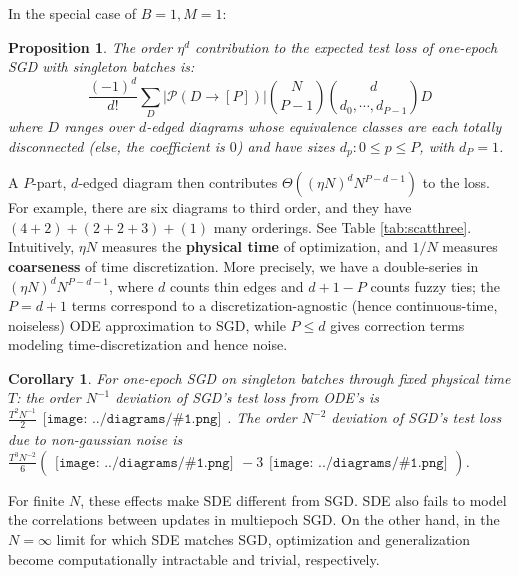 \documentclass{article}
\newtheorem{cor}{Corollary}
\newtheorem{prop}{Proposition}
\newcommand{\Pp}{\mathcal{P}}
\newcommand{\wrap}[1]{\left( #1 \right)}
\newcommand{\dia} [1]{\begin{gathered}\texttt{[image: ../diagrams/\#1.png]}\end{gathered}}
\newcommand{\sdia}[1]{\begin{gathered}\texttt{[image: ../diagrams/\#1.png]}\end{gathered}}
\begin{document}
    In the special case of $B=1, M=1$:
    \begin{prop}
        The order $\eta^d$ contribution to the expected test loss of one-epoch
        SGD with singleton batches is:
        \begin{equation}\label{eq:sgdbasiccoef}
            \frac{(-1)^d}{d!} \sum_D |\Pp(D\to [P])| {N \choose P-1} {d \choose d_0,\cdots,d_{P-1}}
            D
        \end{equation}
        where $D$ ranges over $d$-edged diagrams whose equivalence classes
        are each totally disconnected (else, the coefficient is $0$) and have
        sizes $d_p: 0\leq p\leq P$, with $d_P=1$.
    \end{prop}
    A $P$-part, $d$-edged diagram then contributes $\Theta\left((\eta N)^d
    N^{P-d-1}\right)$ to the loss.  For example, there are six diagrams to
    third order, and they have $(4+2)+(2+2+3)+(1)$ many orderings.  See Table
    \ref{tab:scatthree}.  Intuitively, $\eta N$ measures the {\bf physical
    time} of optimization, and $1/N$ measures {\bf coarseness} of time
    discretization.  More precisely, we have a double-series in $(\eta N)^d
    N^{P-d-1}$, where $d$ counts thin edges and $d+1-P$ counts fuzzy ties; the
    $P=d+1$ terms correspond to a discretization-agnostic (hence
    continuous-time, noiseless) ODE approximation to SGD, while $P\leq d$ gives
    correction terms modeling time-discretization and hence noise.  
    \begin{cor}
        For one-epoch SGD on singleton batches through fixed physical time $T$:
        the order $N^{-1}$ deviation of SGD's test loss from ODE's is
        $
            \frac{T^2 N^{-1}}{2} \dia{c(01-2)(02-12)}
        $.
        The order $N^{-2}$ deviation of SGD's test loss due to non-gaussian
        noise is
        $
            \frac{T^3 N^{-2}}{6} \wrap{\sdia{c(012-3)(03-13-23)} - 3 \sdia{c(01-2-3)(03-13-23)}}
        $.
    \end{cor}
    For finite $N$, these effects make SDE different from SGD.  SDE also fails
    to model the correlations between updates in multiepoch SGD.  On the other
    hand, in the $N=\infty$ limit for which SDE matches SGD, optimization and
    generalization become computationally intractable and trivial,
    respectively. 
\end{document}
